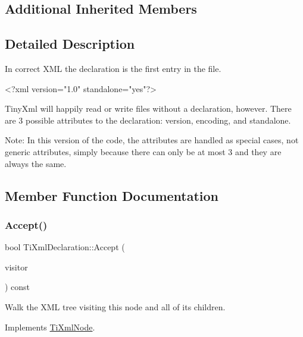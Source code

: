 \subsection*{Additional Inherited Members}


\subsection{Detailed Description}
In correct X\+ML the declaration is the first entry in the file. \begin{DoxyVerb}    <?xml version="1.0" standalone="yes"?>
\end{DoxyVerb}


Tiny\+Xml will happily read or write files without a declaration, however. There are 3 possible attributes to the declaration\+: version, encoding, and standalone.

Note\+: In this version of the code, the attributes are handled as special cases, not generic attributes, simply because there can only be at most 3 and they are always the same. 

\subsection{Member Function Documentation}
\hypertarget{class_ti_xml_declaration_aa1b6bade6c989407ce9881bdfc73c1e6}{}\label{class_ti_xml_declaration_aa1b6bade6c989407ce9881bdfc73c1e6} 
\subsubsection{\texorpdfstring{Accept()}{Accept()}}
{\footnotesize\ttfamily bool Ti\+Xml\+Declaration\+::\+Accept (\begin{DoxyParamCaption}\item[{\hyperlink{class_ti_xml_visitor}{Ti\+Xml\+Visitor} $\ast$}]{visitor }\end{DoxyParamCaption}) const\hspace{0.3cm}{\ttfamily [virtual]}}

Walk the X\+ML tree visiting this node and all of its children. 

Implements \hyperlink{class_ti_xml_node_acc0f88b7462c6cb73809d410a4f5bb86}{Ti\+Xml\+Node}.

\hypertarget{class_ti_xml_declaration_ae46cff6565f299210ab945e78bf28514}{}\label{class_ti_xml_declaration_ae46cff6565f299210ab945e78bf28514} 
